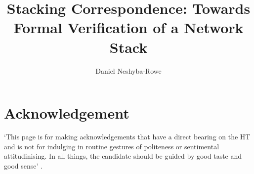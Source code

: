 \documentclass[twoside]{memoir}
\title{Stacking Correspondence: Towards Formal Verification of a Network Stack}
\author{Daniel Neshyba-Rowe}
\begin{document}
\frontmatter


\maketitle

\chapter{Acknowledgement}
`This page is for making acknowledgements that have a direct bearing on the HT and is not for indulging in routine gestures of politeness or sentimental attitudinising. In all things, the candidate should be guided by good taste and good sense' . %
\end{document}
